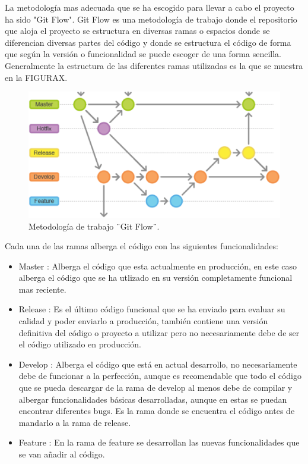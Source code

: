 La metodología mas adecuada que se ha escogido para llevar a cabo el proyecto ha sido "Git Flow".
Git Flow es una metodología de trabajo donde el repositorio que aloja el proyecto se estructura en diversas ramas o espacios donde se diferencian diversas partes del código y donde se estructura el código de forma que según la versión o funcionalidad se puede escoger de una forma sencilla. Generalmente la estructura de las diferentes ramas utilizadas es la que se muestra en la FIGURAX.
\begin{figure}[h]
    \centering
    \includegraphics[scale=0.25]{fig/gitFlow.png}
    \caption{Metodología de trabajo ¨Git Flow¨.}
    \label{fig:mesh1}
\end{figure}

Cada una de las ramas alberga el código con las siguientes funcionalidades:
\begin{itemize}
\item Master : Alberga el código que esta actualmente en producción, en este caso alberga el código que se ha utlizado en su versión completamente funcional mas reciente. 
\item Release : Es el último código funcional que se ha enviado para evaluar su calidad y poder enviarlo a producción, también contiene una versión definitiva del código o proyecto a utilizar pero no necesariamente debe de ser el código utilizado en producción.
\item Develop  : Alberga el código que está en actual desarrollo, no necesariamente debe de funcionar a la perfección, aunque es recomendable que todo el código que se pueda descargar de la rama de develop al menos debe de compilar y albergar funcionalidades básicas desarrolladas, aunque en estas se puedan encontrar diferentes bugs. Es la rama donde se encuentra el código antes de mandarlo a la rama de release.
\item Feature : En la rama de feature se desarrollan las nuevas funcionalidades que se van añadir al código.
\end{itemize}


